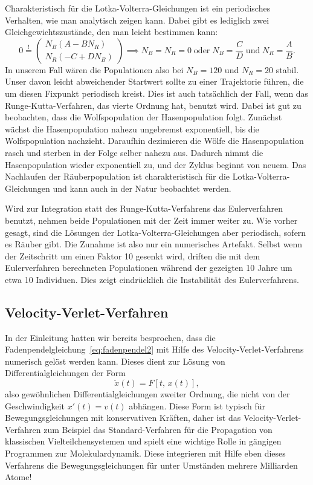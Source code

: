 Charakteristisch für die Lotka-Volterra-Gleichungen ist ein
periodisches Verhalten, wie man analytisch zeigen kann. Dabei gibt es
lediglich zwei Gleichgewichtszustände, den man leicht bestimmen kann:
\begin{equation}
  0 \stackrel{!}{=}
  \begin{pmatrix}
    N_B (A - B N_R)\\
    N_R (-C + D N_B)
  \end{pmatrix}
  \implies N_B=N_R=0\;
  \text{oder}\;N_B=\frac{C}{D}\;\text{und}\;N_R=\frac{A}{B}.
\end{equation}
In unserem Fall wären die Populationen also bei $N_B=120$ und $N_R=20$
stabil. Unser davon leicht abweichender Startwert sollte zu einer
Trajektorie führen, die um diesen Fixpunkt periodisch kreist. Dies ist
auch tatsächlich der Fall, wenn das Runge-Kutta-Verfahren, das vierte
Ordnung hat, benutzt wird. Dabei ist gut zu beobachten, dass die
Wolfspopulation der Hasenpopulation folgt. Zunächst wächst die
Hasenpopulation nahezu ungebremst exponentiell, bis die
Wolfspopulation nachzieht. Daraufhin dezimieren die Wölfe die
Hasenpopulation rasch und sterben in der Folge selber nahezu
aus. Dadurch nimmt die Hasenpopulation wieder exponentiell zu, und der
Zyklus beginnt von neuem. Das Nachlaufen der Räuberpopulation ist
charakteristisch für die Lotka-Volterra-Gleichungen und kann auch in
der Natur beobachtet werden.

Wird zur Integration statt des Runge-Kutta-Verfahrens das
Eulerverfahren benutzt, nehmen beide Populationen mit der Zeit immer
weiter zu. Wie vorher gesagt, sind die Lösungen der
Lotka-Volterra-Gleichungen aber periodisch, sofern es Räuber gibt. Die
Zunahme ist also nur ein numerisches Artefakt. Selbst wenn der
Zeitschritt um einen Faktor 10 gesenkt wird, driften die mit dem
Eulerverfahren berechneten Populationen während der gezeigten 10 Jahre
um etwa 10 Individuen. Dies zeigt eindrücklich die Instabilität des
Eulerverfahrens.

\subsection{Velocity-Verlet-Verfahren}

In der Einleitung hatten wir bereits besprochen, dass die
Fadenpendelgleichung~\eqref{eq:fadenpendel2} mit Hilfe des
Velocity-Verlet-Verfahrens numerisch gelöst werden kann. Dieses dient
zur Lösung von Differentialgleichungen der Form
\begin{equation}
  \ddot x(t) = F[t,\, x(t)],
\end{equation}
also gewöhnlichen Differentialgleichungen zweiter Ordnung, die nicht
von der Geschwindigkeit $x'(t) = v(t)$ abhängen. Diese Form ist
typisch für Bewegungsgleichungen mit konservativen Kräften, daher ist
das Velocity-Verlet-Verfahren zum Beispiel das Standard-Verfahren für
die Propagation von klassischen Vielteilchensystemen und spielt eine
wichtige Rolle in gängigen Programmen zur Molekulardynamik. Diese
integrieren mit Hilfe eben dieses Verfahrens die Bewegungsgleichungen
für unter Umständen mehrere Milliarden Atome!

